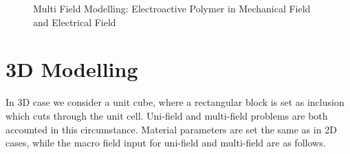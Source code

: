 \documentclass[10pt,a4paper]{scrreprt}
\begin{document}
\begin{figure}[htbp]
  \caption{Multi Field Modelling: Electroactive Polymer in Mechanical Field and Electrical Field}
\end{figure}

\newpage
\section{3D Modelling}
In 3D case we consider a unit cube, where a rectangular block is set as inclusion which cuts through the unit cell. Uni-field and multi-field problems are both accounted in this circumstance. Material parameters are set the same as in 2D cases, while the macro field input for uni-field and multi-field are as follows.
\end{document}
